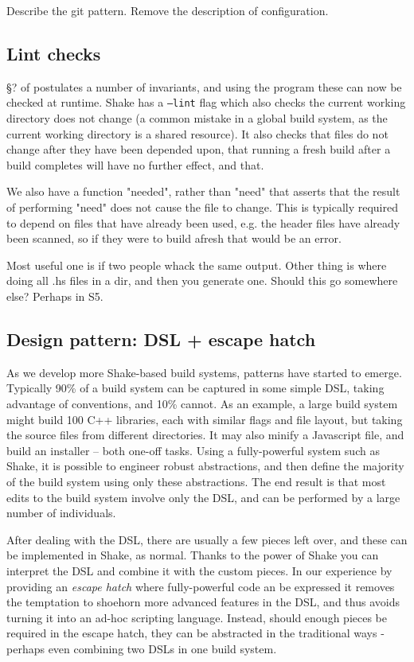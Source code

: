 Describe the git pattern. Remove the description of configuration.

\subsection{Lint checks}

\S? of \cite{shake} postulates a number of invariants, and using the  program these can now be checked at runtime. Shake has a \texttt{--lint} flag which also checks the current working directory does not change (a common mistake in a global build system, as the current working directory is a shared resource). It also checks that files do not change after they have been depended upon, that running a fresh build after a build completes will have no further effect, and that.

We also have a function \lst"needed", rather than \lst"need" that asserts that the result of performing \lst"need" does not cause the file to change. This is typically required to depend on files that have already been used, e.g. the header files have already been scanned, so if they were to build afresh that would be an error.

Most useful one is if two people whack the same output. Other thing is where doing all .hs files in a dir, and then you generate one. Should this go somewhere else? Perhaps in S5.

\subsection{Design pattern: DSL + escape hatch}


As we develop more Shake-based build systems, patterns have started to emerge. Typically 90\% of a build system can be captured in some simple DSL, taking advantage of conventions, and 10\% cannot. As an example, a large build system might build 100 C++ libraries, each with similar flags and file layout, but taking the source files from different directories. It may also minify a Javascript file, and build an installer -- both one-off tasks. Using a fully-powerful system such as Shake, it is possible to engineer robust abstractions, and then define the majority of the build system using only these abstractions. The end result is that most edits to the build system involve only the DSL, and can be performed by a large number of individuals.

After dealing with the DSL, there are usually a few pieces left over, and these can be implemented in Shake, as normal. Thanks to the power of Shake you can interpret the DSL and combine it with the custom pieces. In our experience by providing an \textit{escape hatch} where fully-powerful code an be expressed it removes the temptation to shoehorn more advanced features in the DSL, and thus avoids turning it into an ad-hoc scripting language. Instead, should enough pieces be required in the escape hatch, they can be abstracted in the traditional ways - perhaps even combining two DSLs in one build system.
